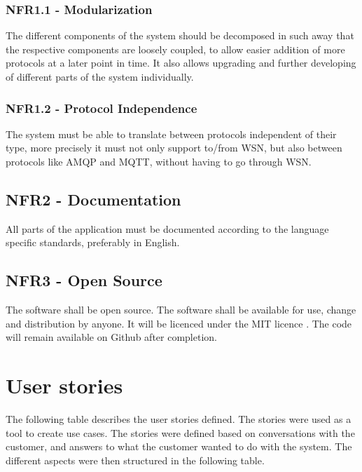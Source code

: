 \subsubsection{NFR1.1 - Modularization}
\label{subsec:requirements_engineering-non_functional_requirements-modularization}

The different components of the system should be decomposed in such away that the respective components are loosely coupled, to allow easier addition of more protocols at a later point in time. It also allows upgrading and further developing of different parts of the system individually.

\subsubsection{NFR1.2 - Protocol Independence}
\label{subsec:requirements_engineering-non_functional_requirements-protocol_independence}

The system must be able to translate between protocols independent of their type, more precisely it must not only support to/from WSN, but also between protocols like AMQP and MQTT, without having to go through WSN.

\subsection{NFR2 - Documentation}
\label{subsec:requirements_engineering-non_functional_requirements-documentation}

All parts of the application must be documented according to the language specific standards, preferably in English.

\subsection{NFR3 - Open Source}
\label{subsec:requirements_engineering-non_functional_requirements-open_source}

The software shall be open source. The software shall be available for use, change and distribution by anyone. It will be licenced under the MIT licence \cite{mit-license}. The code will remain available on Github after completion.

\section{User stories}
\label{sec:requirements_engineering-user_stories}

The following table describes the user stories defined. The stories were used as a tool to create use cases. The stories were defined based on conversations with the customer, and answers to what the customer wanted to do with the system. The different aspects were then structured in the following table. 

